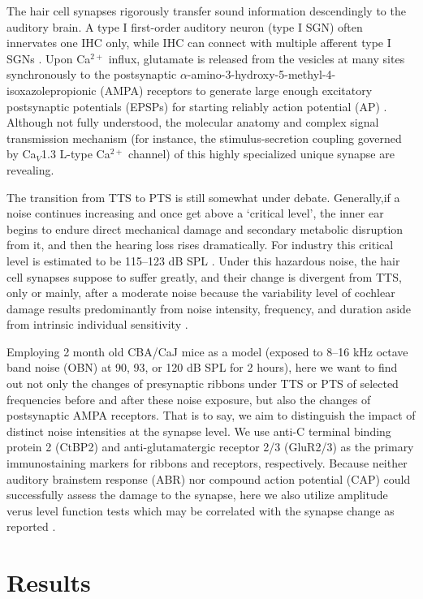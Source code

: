 \documentclass[11pt]{article}
\begin{document}
The hair cell synapses rigorously transfer sound information descendingly to the auditory brain. A type I first-order auditory neuron (type I SGN) often innervates one IHC only, while IHC can connect with multiple afferent type I SGNs \cite{Spoendlin1972}. Upon Ca$^{2+}$ influx, glutamate is released from the vesicles at many sites synchronously to the postsynaptic $\alpha$-amino-3-hydroxy-5-methyl-4-isoxazolepropionic (AMPA) receptors to generate large enough excitatory postsynaptic potentials (EPSPs) for starting reliably action potential (AP) \cite{Safieddine2012}. Although not fully understood, the molecular anatomy and complex signal transmission mechanism (for instance, the stimulus-secretion coupling governed by Ca$_V$1.3 L-type Ca$^{2+}$ channel) of this highly specialized unique synapse are revealing.

The transition from TTS to PTS is still somewhat under debate. Generally,if a noise continues increasing and once get above a `critical level', the inner ear begins to endure direct mechanical damage and secondary metabolic disruption from it, and then the hearing loss rises dramatically. For industry this critical level is estimated to be 115--123 dB SPL \cite{Henderson1986}. Under this hazardous noise, the hair cell synapses suppose to suffer greatly, and their change is divergent from TTS, only or mainly, after a moderate noise because the variability level of cochlear damage results predominantly from noise intensity, frequency, and duration aside from intrinsic individual sensitivity \cite{Thorne1986}.

Employing 2 month old CBA/CaJ mice as a model (exposed to 8--16 kHz octave band noise (OBN) at 90, 93, or 120 dB SPL for 2 hours), here we want to find out not only the changes of presynaptic ribbons under TTS or PTS of selected frequencies before and after these noise exposure, but also the changes of postsynaptic AMPA receptors. That is to say, we aim to distinguish the impact of distinct noise intensities at the synapse level. We use anti-C terminal binding protein 2 (CtBP2) and anti-glutamatergic receptor 2/3 (GluR2/3) as the primary immunostaining markers for ribbons and receptors, respectively. Because neither auditory brainstem response (ABR) nor compound action potential (CAP) could successfully assess the damage to the synapse, here we also utilize amplitude verus level function tests which may be correlated with the synapse change as reported \cite{Kujawa2009,Maison2010}.



\section {Results}
\end{document}
